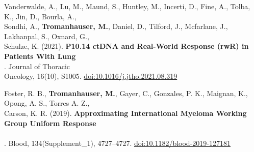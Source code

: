 \documentclass{resume} %
\begin{document}
\hspace*{1mm}Vanderwalde, A., Lu, M., Maund, S., Huntley, M., Incerti, D., Fine, A., Tolba, K., Jin, D., Bourla, A., \\
\hspace*{2mm}Sondhi, A., {\bf Tromanhauser, M.}, Daniel, D., Tilford, J., Mcfarlane, J., Lakhanpal, S., Oxnard, G., \\
\hspace*{2mm}Schulze, K. (2021). {\bf P10.14 ctDNA and Real-World Response (rwR) in Patients With Lung} \\
\hspace*{2mm}{\bf Cancer From A Prospective Real-World Clinico-Genomic (PCG) Study}. Journal of Thoracic \\
\hspace*{2mm}Oncology, 16(10), S1005. \href{https://doi.org/10.1016/j.jtho.2021.08.319}{doi:10.1016/j.jtho.2021.08.319}

\hspace*{1mm}Foster, R. B., {\bf Tromanhauser, M.}, Gayer, C., Gonzales, P. K., Maignan, K., Opong, A. S., Torres A. Z., \\
\hspace*{2mm}Carson, K. R. (2019). {\bf Approximating International Myeloma Working Group Uniform Response} \\
\hspace*{2mm}{\bf Criteria to Derive Response for Multiple Myeloma (MM) Patients Using Data from Electronic} \\
\hspace*{2mm}{\bf Health Records (EHR)}. Blood, 134(Supplement\_1), 4727–4727. \href{https://doi.org/10.1182/blood-2019-127181}{doi:10.1182/blood-2019-127181}


\end{document}
